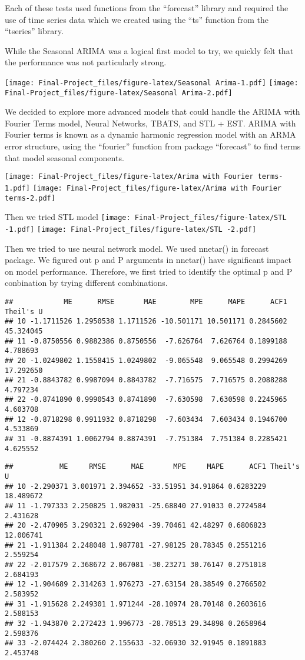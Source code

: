 \documentclass[
]{article}
\begin{document}
Each of these tests used functions from the ``forecast'' library and
required the use of time series data which we created using the ``ts''
function from the ``tseries'' library.

While the Seasonal ARIMA was a logical first model to try, we quickly
felt that the performance was not particularly strong.

\texttt{[image: Final-Project\_files/figure-latex/Seasonal Arima-1.pdf]}
\texttt{[image: Final-Project\_files/figure-latex/Seasonal Arima-2.pdf]}

We decided to explore more advanced models that could handle the ARIMA
with Fourier Terms model, Neural Networks, TBATS, and STL + EST. ARIMA
with Fourier terms is known as a dynamic harmonic regression model with
an ARMA error structure, using the ``fourier'' function from package
``forecast'' to find terms that model seasonal components.

\texttt{[image: Final-Project\_files/figure-latex/Arima with Fourier terms-1.pdf]}
\texttt{[image: Final-Project\_files/figure-latex/Arima with Fourier terms-2.pdf]}

Then we tried STL model
\texttt{[image: Final-Project\_files/figure-latex/STL -1.pdf]}
\texttt{[image: Final-Project\_files/figure-latex/STL -2.pdf]}

Then we tried to use neural network model. We used nnetar() in forecast
package. We figured out p and P arguments in nnetar() have significant
impact on model performance. Therefore, we first tried to identify the
optimal p and P conbination by trying different combinations.

\begin{verbatim}
##            ME      RMSE       MAE        MPE      MAPE      ACF1 Theil's U
## 10 -1.1711526 1.2950538 1.1711526 -10.501171 10.501171 0.2845602 45.324045
## 11 -0.8750556 0.9882386 0.8750556  -7.626764  7.626764 0.1899188  4.788693
## 20 -1.0249802 1.1558415 1.0249802  -9.065548  9.065548 0.2994269 17.292650
## 21 -0.8843782 0.9987094 0.8843782  -7.716575  7.716575 0.2088288  4.797234
## 22 -0.8741890 0.9990543 0.8741890  -7.630598  7.630598 0.2245965  4.603708
## 12 -0.8718298 0.9911932 0.8718298  -7.603434  7.603434 0.1946700  4.533869
## 31 -0.8874391 1.0062794 0.8874391  -7.751384  7.751384 0.2285421  4.625552
\end{verbatim}

\begin{verbatim}
##           ME     RMSE      MAE       MPE     MAPE      ACF1 Theil's U
## 10 -2.290371 3.001971 2.394652 -33.51951 34.91864 0.6283229 18.489672
## 11 -1.797333 2.250825 1.982031 -25.68840 27.91033 0.2724584  2.431628
## 20 -2.470905 3.290321 2.692904 -39.70461 42.48297 0.6806823 12.006741
## 21 -1.911384 2.248048 1.987781 -27.98125 28.78345 0.2551216  2.559254
## 22 -2.017579 2.368672 2.067081 -30.23271 30.76147 0.2751018  2.684193
## 12 -1.904689 2.314263 1.976273 -27.63154 28.38549 0.2766502  2.583952
## 31 -1.915628 2.249301 1.971244 -28.10974 28.70148 0.2603616  2.588153
## 32 -1.943870 2.272423 1.996773 -28.78513 29.34898 0.2658964  2.598376
## 33 -2.074424 2.380260 2.155633 -32.06930 32.91945 0.1891883  2.453748
\end{verbatim}
\end{document}
